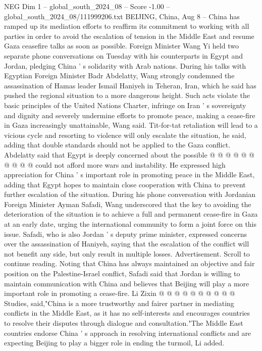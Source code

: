 \begin{textsample}{NEG Dim 1 – global\_south\_2024\_08 – Score -1.00 – global\_south\_2024\_08/111999206.txt}  \label{ex:f1_neg_119}
BEIJING, China, Aug 8 -- China has ramped up its mediation efforts to reaffirm its commitment to working with all parties in order to avoid the escalation of tension in the Middle East and resume Gaza ceasefire talks as soon as possible.
Foreign Minister Wang Yi held two separate phone conversations on Tuesday with his counterparts in Egypt and Jordan, pledging China ' s solidarity with Arab nations.
During his talks with Egyptian Foreign Minister Badr Abdelatty, Wang strongly condemned the assassination of Hamas leader Ismail Haniyeh in Teheran, Iran, which he said has pushed the regional situation to a more dangerous height.
Such acts violate the basic principles of the United Nations Charter, infringe on Iran ' s sovereignty and dignity and severely undermine efforts to promote peace, making a cease-fire in Gaza increasingly unattainable, Wang said.
Tit-for-tat retaliation will lead to a vicious cycle and resorting to violence will only escalate the situation, he said, adding that double standards should not be applied to the Gaza conflict.
Abdelatty said that Egypt is deeply concerned about the possible @ @ @ @ @ @ @ @ @ @ could not afford more wars and instability.
He expressed high appreciation for China ' s important role in promoting peace in the Middle East, adding that Egypt hopes to maintain close cooperation with China to prevent further escalation of the situation.
During his phone conversation with Jordanian Foreign Minister Ayman Safadi, Wang underscored that the key to avoiding the deterioration of the situation is to achieve a full and permanent cease-fire in Gaza at an early date, urging the international community to form a joint force on this issue.
Safadi, who is also Jordan ' s deputy prime minister, expressed concerns over the assassination of Haniyeh, saying that the escalation of the conflict will not benefit any side, but only result in multiple losses.
Advertisement.
Scroll to continue reading.
Noting that China has always maintained an objective and fair position on the Palestine-Israel conflict, Safadi said that Jordan is willing to maintain communication with China and believes that Beijing will play a more important role in promoting a cease-fire.
Li Zixin @ @ @ @ @ @ @ @ @ @ Studies, said,"China is a more trustworthy and fairer partner in mediating conflicts in the Middle East, as it has no self-interests and encourages countries to resolve their disputes through dialogue and consultation."The Middle East countries endorse China ' s approach in resolving international conflicts and are expecting Beijing to play a bigger role in ending the turmoil, Li added.

\end{textsample}
